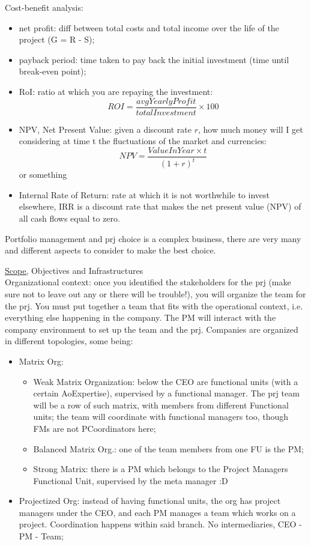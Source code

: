 \noindent Cost-benefit analysis:
\begin{itemize}
    \item net profit: diff between total costs and total income over the life of the project (G = R - S);
    \item payback period: time taken to pay back the initial investment (time until break-even point);
    \item RoI: ratio at which you are repaying the investment:
    \[ROI = \dfrac{avgYearlyProfit}{totalInvestment} \times 100 \]
    \item NPV, Net Present Value: given a discount rate $r$, how much money will I get considering at time t the fluctuations of the market and currencies:
    \[NPV = \frac{ValueInYear \times t}{(1+r)^t}\]
    or something
    \item Internal Rate of Return: rate at which it is not worthwhile to invest elsewhere, IRR is a discount rate that makes the net present value (NPV) of all cash flows equal to zero.
\end{itemize}

\noindent Portfolio management and prj choice is a complex business, there are very many and different aspects to consider to make the best choice.

\newpage \underline{Scope,} Objectives and Infrastructures\\

\noindent Organizational context: once you identified the stakeholders for the prj (make sure not to leave out any or there will be trouble!), you will organize the team for the prj. You must put together a team that fits with the operational context, i.e. everything else happening in the company. The PM will interact with the company environment to set up the team and the prj. Companies are organized in different topologies, some being:
\begin{itemize}
    \item Matrix Org:
    \begin{itemize}
    \item Weak Matrix Organization: below the CEO are functional units (with a certain AoExpertise), supervised by a functional manager. The prj team will be a row of such matrix, with members from different Functional units; the team will coordinate with functional managers too, though FMs are not PCoordinators here;
    \item Balanced Matrix Org.: one of the team members from one FU is the PM;
    \item Strong Matrix: there is a PM which belongs to the Project Managers Functional Unit, supervised by the meta manager :D 
    \end{itemize}
    \item Projectized Org: instead of having functional units, the org has project managers under the CEO, and each PM manages a team which works on a project. Coordination happens within said branch. No intermediaries, CEO - PM - Team;
\end{itemize}

